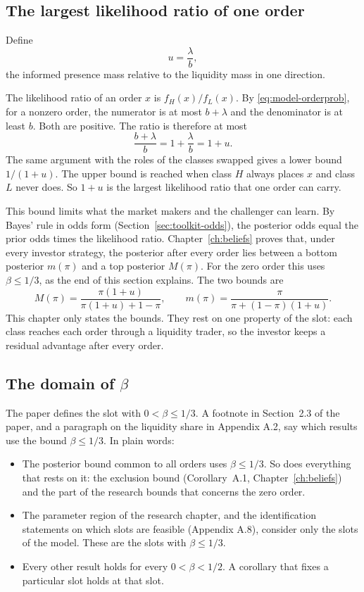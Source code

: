 \subsection*{The largest likelihood ratio of one order}

Define
\[
u=\frac{\lambda}{b},
\]
the informed presence mass relative to the liquidity mass in one direction.

The likelihood ratio of an order \(x\) is \(f_H(x)/f_L(x)\).
By \eqref{eq:model-orderprob}, for a nonzero order, the numerator is at most \(b+\lambda\) and the denominator is at least \(b\).
Both are positive. The ratio is therefore at most
\[
\frac{b+\lambda}{b}=1+\frac{\lambda}{b}=1+u.
\]
The same argument with the roles of the classes swapped gives a lower bound \(1/(1+u)\).
The upper bound is reached when class \(H\) always places \(x\) and class \(L\) never does.
So \(1+u\) is the largest likelihood ratio that one order can carry.

This bound limits what the market makers and the challenger can learn.
By Bayes' rule in odds form (Section~\ref{sec:toolkit-odds}), the posterior odds equal the prior odds times the likelihood ratio.
Chapter~\ref{ch:beliefs} proves that, under every investor strategy, the posterior after every order lies between a bottom posterior \(m(\pi)\) and a top posterior \(M(\pi)\).
For the zero order this uses \(\beta\le1/3\), as the end of this section explains.
The two bounds are
\begin{equation}\label{eq:model-bounds}
M(\pi)=\frac{\pi(1+u)}{\pi(1+u)+1-\pi},\qquad
m(\pi)=\frac{\pi}{\pi+(1-\pi)(1+u)}.
\end{equation}
This chapter only states the bounds. They rest on one property of the slot: each class reaches each order through a liquidity trader, so the investor keeps a residual advantage after every order.

\subsection*{The domain of \texorpdfstring{\(\beta\)}{beta}}

The paper defines the slot with \(0<\beta\le1/3\).
A footnote in Section~2.3 of the paper, and a paragraph on the liquidity share in Appendix A.2, say which results use the bound \(\beta\le1/3\).
In plain words:
\begin{itemize}
\item The posterior bound common to all orders uses \(\beta\le1/3\). So does everything that rests on it: the exclusion bound (Corollary~A.1, Chapter~\ref{ch:beliefs}) and the part of the research bounds that concerns the zero order.
\item The parameter region of the research chapter, and the identification statements on which slots are feasible (Appendix A.8), consider only the slots of the model. These are the slots with \(\beta\le1/3\).
\item Every other result holds for every \(0<\beta<1/2\). A corollary that fixes a particular slot holds at that slot.
\end{itemize}

